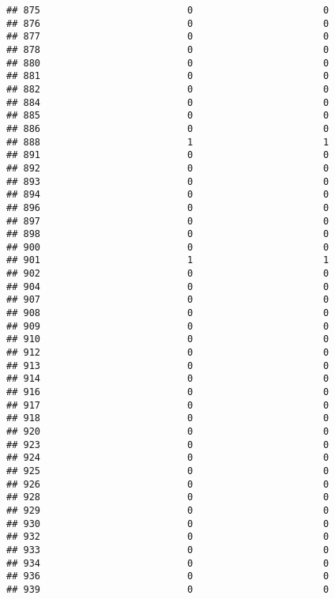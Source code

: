 \documentclass[
]{article}
\begin{document}
\begin{verbatim}
## 875                          0                       0
## 876                          0                       0
## 877                          0                       0
## 878                          0                       0
## 880                          0                       0
## 881                          0                       0
## 882                          0                       0
## 884                          0                       0
## 885                          0                       0
## 886                          0                       0
## 888                          1                       1
## 891                          0                       0
## 892                          0                       0
## 893                          0                       0
## 894                          0                       0
## 896                          0                       0
## 897                          0                       0
## 898                          0                       0
## 900                          0                       0
## 901                          1                       1
## 902                          0                       0
## 904                          0                       0
## 907                          0                       0
## 908                          0                       0
## 909                          0                       0
## 910                          0                       0
## 912                          0                       0
## 913                          0                       0
## 914                          0                       0
## 916                          0                       0
## 917                          0                       0
## 918                          0                       0
## 920                          0                       0
## 923                          0                       0
## 924                          0                       0
## 925                          0                       0
## 926                          0                       0
## 928                          0                       0
## 929                          0                       0
## 930                          0                       0
## 932                          0                       0
## 933                          0                       0
## 934                          0                       0
## 936                          0                       0
## 939                          0                       0

\end{verbatim}
\end{document}
